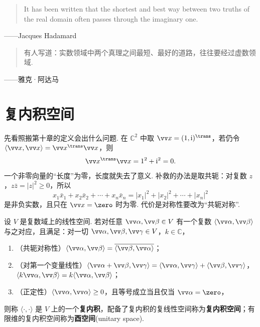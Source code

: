 	\newpage
	
	\begin{tcolorbox}[epigraph]
		\begin{quote}It has been written that the shortest and best way between two truths of the real domain often passes through the imaginary one.\end{quote}
		\begin{flushright}——Jacques Hadamard\end{flushright}
		\begin{quote}有人写道：实数领域中两个真理之间最短、最好的道路，往往要经过虚数领域.\end{quote}
		\begin{flushright}——雅克·阿达马\footnotemark\end{flushright}
	\end{tcolorbox}
	
	\section{\hC 复内积空间}\label{sec:complexip}
	
	先看照搬第十章的定义会出什么问题. 在 $\mathbb{C}^2$ 中取 $\vv x=(1,\mathrm i)^\trans$，若仍令 $\langle\vv x,\vv x\rangle=\vv x^\trans\vv x$，则
	\[\vv x^\trans\vv x=1^2+\mathrm i^2=0.\]
	一个非零向量的“长度”为零，长度就失去了意义. 补救的办法是取共轭：对复数 $z$，$z\bar z=|z|^2\ge0$，所以
	\[x_1\bar x_1+x_2\bar x_2+\cdots+x_n\bar x_n=|x_1|^2+|x_2|^2+\cdots+|x_n|^2\]
	是非负实数，且只在 $\vv x=\zero$ 时为零. 代价是对称性要改为“共轭对称”.
	
	\begin{definition}\label{def:complexip}
		设 $V$ 是复数域上的线性空间. 若对任意 $\vv\alpha,\vv\beta\in V$ 有一个复数 $\langle\vv\alpha,\vv\beta\rangle$ 与之对应，且满足：对一切 $\vv\alpha,\vv\beta,\vv\gamma\in V$，$k\in\mathbb{C}$，
		\begin{enumerate}
			\item （共轭对称性）$\langle\vv\alpha,\vv\beta\rangle=\overline{\langle\vv\beta,\vv\alpha\rangle}$；
			\item （对第一个变量线性）$\langle\vv\alpha+\vv\beta,\vv\gamma\rangle=\langle\vv\alpha,\vv\gamma\rangle+\langle\vv\beta,\vv\gamma\rangle$，$\langle k\vv\alpha,\vv\beta\rangle=k\langle\vv\alpha,\vv\beta\rangle$；
			\item （正定性）$\langle\vv\alpha,\vv\alpha\rangle\ge0$，且等号成立当且仅当 $\vv\alpha=\zero$，
		\end{enumerate}
		则称 $\langle\cdot,\cdot\rangle$ 是 $V$ 上的一个\textbf{复内积}，配备了复内积的复线性空间称为\textbf{复内积空间}；有限维的复内积空间称为\textbf{酉空间}(unitary space).
	\end{definition}
	
